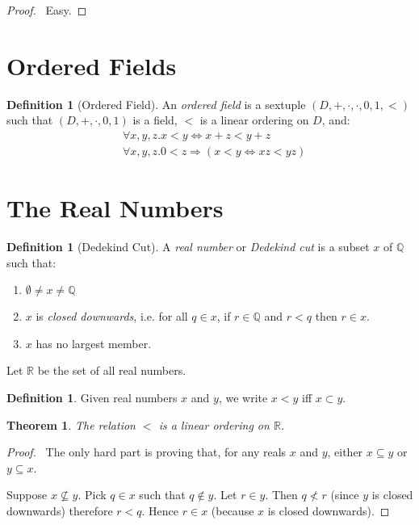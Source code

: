 \documentclass{article}
\let\qed\relax
\newtheorem{theorem}[axiom]{Theorem}
\theoremstyle{definition}
\newtheorem{definition}[axiom]{Definition}
\begin{document}
    \begin{proof}
        \pf\ Easy. \qed
    \end{proof}

    \section{Ordered Fields}

    \begin{definition}[Ordered Field]
        An \emph{ordered field} is a sextuple $(D, +, \cdot, \cdot, 0, 1, <)$ such that $(D, +, \cdot, 0, 1)$
        is a field, $<$ is a linear ordering on $D$, and:
        \begin{align*}
            & \forall x,y,z. x < y \Leftrightarrow x + z < y + z \\
            & \forall x,y,z. 0 < z \Rightarrow (x < y \Leftrightarrow xz < yz)
        \end{align*}
    \end{definition}

    \section{The Real Numbers}

    \begin{definition}[Dedekind Cut]
        A \emph{real number} or \emph{Dedekind cut} is a subset $x$ of $\mathbb{Q}$ such that:
        \begin{enumerate}
            \item $\emptyset \neq x \neq \mathbb{Q}$
            \item $x$ is \emph{closed downwards}, i.e. for all $q \in x$, if $r \in \mathbb{Q}$
            and $r < q$ then $r \in x$.
            \item $x$ has no largest member.
        \end{enumerate}
        Let $\mathbb{R}$ be the set of all real numbers.
    \end{definition}

    \begin{definition}
        Given real numbers $x$ and $y$, we write $x < y$ iff $x \subset y$.
    \end{definition}

    \begin{theorem}
        The relation $<$ is a linear ordering on $\mathbb{R}$.
    \end{theorem}

    \begin{proof}
        \pf\ The only hard part is proving that, for any reals $x$ and $y$, either $x \subseteq y$ or
        $y \subseteq x$.

        Suppose $x \nsubseteq y$. Pick $q \in x$ such that $q \notin y$. Let $r \in y$. Then $q \nless r$
        (since $y$ is closed downwards) therefore $r < q$. Hence $r \in x$ (because $x$ is closed downwards).
        \qed
    \end{proof}
\end{document}
